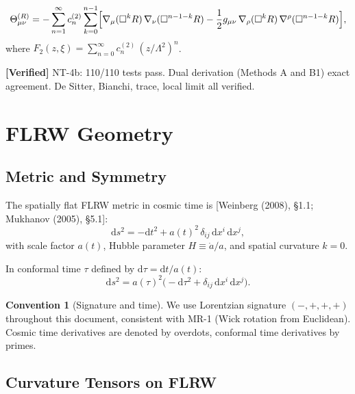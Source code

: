 \documentclass[12pt,a4paper]{article}
\theoremstyle{definition}
\newtheorem{convention}[proposition]{Convention}
\theoremstyle{remark}
\newcommand{\dd}{\mathrm{d}}
\newcommand{\fromlit}[1]{\textcolor{blue!70!black}{\textsf{[#1]}}}
\newcommand{\verified}[1]{%
  \par\smallskip\noindent
  \colorbox{green!10}{\parbox{\dimexpr\linewidth-2\fboxsep}{%
    \textcolor{green!50!black}{\textbf{[Verified]}} #1}}%
  \par\smallskip}
\begin{document}
\begin{equation}\label{eq:Theta-R}
  \Theta^{(R)}_{\mu\nu} = -\sum_{n=1}^{\infty} c_n^{(2)}
  \sum_{k=0}^{n-1}
  \Bigl[\nabla_\mu(\Box^k R)\,\nabla_\nu(\Box^{n-1-k} R)
  - \frac{1}{2}g_{\mu\nu}\,\nabla_\rho(\Box^k R)\,
  \nabla^\rho(\Box^{n-1-k} R)\Bigr],
\end{equation}
where $F_2(z,\xi) = \sum_{n=0}^{\infty} c_n^{(2)}\,(z/\Lambda^2)^n$.

\verified{NT-4b: 110/110 tests pass. Dual derivation (Methods A and
B1) exact agreement. De Sitter, Bianchi, trace, local limit all
verified.}

\section{FLRW Geometry}\label{sec:flrw}

\subsection{Metric and Symmetry}

The spatially flat FLRW metric in cosmic time is \fromlit{Weinberg
(2008), \S1.1; Mukhanov (2005), \S5.1}:
\begin{equation}\label{eq:flrw-metric}
  \dd s^2 = -\dd t^2 + a(t)^2\,\delta_{ij}\,\dd x^i\,\dd x^j,
\end{equation}
with scale factor $a(t)$, Hubble parameter $H \equiv \dot{a}/a$,
and spatial curvature $k = 0$.

In conformal time $\tau$ defined by $\dd\tau = \dd t/a(t)$:
\begin{equation}\label{eq:flrw-conformal}
  \dd s^2 = a(\tau)^2\bigl(-\dd\tau^2 + \delta_{ij}\,\dd x^i\,\dd x^j\bigr).
\end{equation}

\begin{convention}[Signature and time]
We use Lorentzian signature $(-,+,+,+)$ throughout this document,
consistent with MR-1 (Wick rotation from Euclidean). Cosmic time
derivatives are denoted by overdots, conformal time derivatives by
primes.
\end{convention}

\subsection{Curvature Tensors on FLRW}\label{sec:flrw-curvature}
\end{document}
